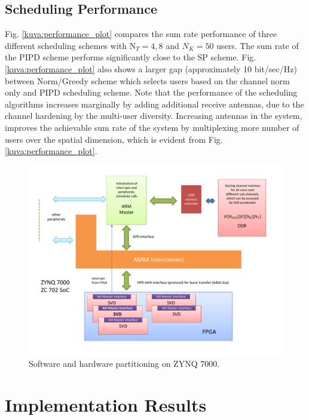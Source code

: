 \documentclass[conference,letterpaper,10pt]{./../../IEEE/IEEEtran}
\begin{document}
\subsection{Scheduling Performance}
Fig. \ref{kuva:performance_plot} compares the sum rate performance of three different scheduling schemes with $\textrm{N}_T = 4,8$ and $N_K = 50$ users. The sum rate of the PIPD scheme performs significantly close to the SP scheme. Fig. \ref{kuva:performance_plot} also shows a larger gap (approximately 10 bit/sec/Hz) between Norm/Greedy scheme which selects users based on the channel norm only and PIPD scheduling scheme. Note that the performance of the scheduling algorithms increases marginally by adding additional receive antennas, due to the channel hardening by the multi-user diversity. Increasing  antennas in the system, improves the achievable sum rate of the system by multiplexing more number of users over the spatial dimension, which is evident from Fig. \ref{kuva:performance_plot}.
\begin{figure}
	\centering
	\includegraphics[trim=.75in .75in .75in .75in,width=\columnwidth]{blk_diag}
	\caption{Software and hardware partitioning on ZYNQ 7000.}
	\label{kuva:block_diag}
\end{figure}

\section{Implementation Results}
\label{sec:implementation}
\end{document}
